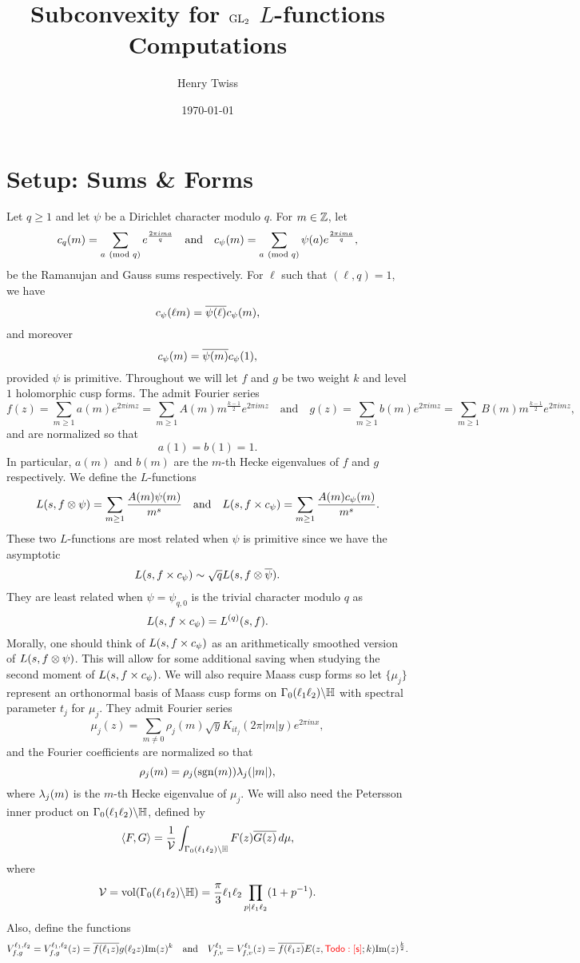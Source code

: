 \documentclass[12pt,reqno,oneside]{amsart}
\title{Subconvexity for $\mathrm{GL}_{2}$ $L$-functions Computations}
\author{Henry Twiss}
\date{\today}
\begin{document}
\maketitle

\section{Setup: Sums \& Forms}
  Let $q \ge 1$ and let $\psi$ be a Dirichlet character modulo $q$. For $m \in \mathbb{Z}$, let
  \[
    c_{q}(m) = \sum_{a \ \left(\text{mod }q\right)}e^{\frac{2\pi ima}{q}} \quad \text{and} \quad c_{\psi}(m) = \sum_{a \ \left(\text{mod }q\right)}\psi(a)e^{\frac{2\pi ima}{q}},
  \]
  be the Ramanujan and Gauss sums respectively. For $\ell$ such that $(\ell,q) = 1$, we have
  \[
    c_{\psi}(\ell m) = \overline{\psi(\ell)}c_{\psi}(m),
  \]
  and moreover
  \[
    c_{\psi}(m) = \overline{\psi(m)}c_{\psi}(1),
  \]
  provided $\psi$ is primitive. Throughout we will let $f$ and $g$ be two weight $k$ and level $1$ holomorphic cusp forms. The admit Fourier series
  \[
    f(z) = \sum_{m \ge 1}a(m)e^{2\pi imz} = \sum_{m \ge 1}A(m)m^{\frac{k-1}{2}}e^{2\pi imz} \quad \text{and} \quad g(z) = \sum_{m \ge 1}b(m)e^{2\pi imz} = \sum_{m \ge 1}B(m)m^{\frac{k-1}{2}}e^{2\pi imz},
  \]
  and are normalized so that
  \[
    a(1) = b(1) = 1.
  \]
  In particular, $a(m)$ and $b(m)$ are the $m$-th Hecke eigenvalues of $f$ and $g$ respectively. We define the $L$-functions
  \[
    L(s,f \otimes \psi) = \sum_{m \ge 1}\frac{A(m)\psi(m)}{m^{s}} \quad \text{and} \quad L(s,f \times c_{\psi}) = \sum_{m \ge 1}\frac{A(m)c_{\psi}(m)}{m^{s}}.
  \]
  These two $L$-functions are most related when $\psi$ is primitive since we have the asymptotic
  \[
    L(s,f \times c_{\psi}) \sim \sqrt{q}L(s,f \otimes \overline{\psi}).
  \]
  They are least related when $\psi = \psi_{q,0}$ is the trivial character modulo $q$ as
  \[
    L(s,f \times c_{\psi}) = L^{(q)}(s,f).
  \]
  Morally, one should think of $L(s,f \times c_{\psi})$ as an arithmetically smoothed version of $L(s,f \otimes \psi)$. This will allow for some additional saving when studying the second moment of $L(s,f \times c_{\psi})$. We will also require Maass cusp forms so let $\{\mu_{j}\}$ represent an orthonormal basis of Maass cusp forms on $\Gamma_{0}(\ell_{1}\ell_{2})\backslash\mathbb{H}$ with spectral parameter $t_{j}$ for $\mu_{j}$. They admit Fourier series
  \[
    \mu_{j}(z) = \sum_{m \neq 0}\rho_{j}(m)\sqrt{y}K_{it_{j}}(2\pi|m|y)e^{2\pi inx},
  \]
  and the Fourier coefficients are normalized so that
  \[
    \rho_{j}(m) = \rho_{j}(\operatorname{\mathrm{sgn}}(m))\lambda_{j}(|m|),
  \]
  where $\lambda_{j}(m)$ is the $m$-th Hecke eigenvalue of $\mu_{j}$. We will also need the Petersson inner product on $\Gamma_{0}(\ell_{1}\ell_{2})\backslash\mathbb{H}$, defined by
  \[
    \langle F,G\rangle = \frac{1}{\mathcal{V}}\int_{\Gamma_{0}(\ell_{1}\ell_{2})\backslash\mathbb{H}}F(z)\overline{G(z)}\,d\mu,
  \]
  where
  \[
    \mathcal{V} = \mathrm{vol}(\Gamma_{0}(\ell_{1}\ell_{2})\backslash\mathbb{H}) = \frac{\pi}{3}\ell_{1}\ell_{2}\prod_{p \mid \ell_{1}\ell_{2}}(1+p^{-1}).
  \]
  Also, define the functions
  \[
    V_{f,g}^{\ell_{1},\ell_{2}} = V_{f,g}^{\ell_{1},\ell_{2}}(z) = \overline{f(\ell_{1}z)}g(\ell_{2}z)\mathrm{Im}(z)^{k} \quad \text{and} \quad V_{f,v}^{\ell_{1}} = V_{f,v}^{\ell_{1}}(z) = \overline{f(\ell_{1}z)}E(z,\textcolor{red}{\sf Todo: [s]};k)\mathrm{Im}(z)^{\frac{k}{2}}.
  \]
\end{document}
